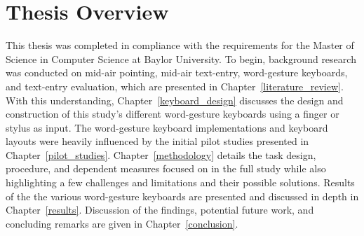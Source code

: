 \section{Thesis Overview}
This thesis was completed in compliance with the requirements for the Master of Science in Computer Science at Baylor University. To begin, background research was conducted on mid-air pointing, mid-air text-entry, word-gesture keyboards, and text-entry evaluation, which are presented in Chapter~\ref{literature_review}. With this understanding, Chapter~\ref{keyboard_design} discusses the design and construction of this study's different word-gesture keyboards using a finger or stylus as input. The word-gesture keyboard implementations and keyboard layouts were heavily influenced by the initial pilot studies presented in Chapter~\ref{pilot_studies}. Chapter~\ref{methodology} details the task design, procedure, and dependent measures focused on in the full study while also highlighting a few challenges and limitations and their possible solutions. Results of the the various word-gesture keyboards are presented and discussed in depth in Chapter~\ref{results}. Discussion of the findings, potential future work, and concluding remarks are given in Chapter~\ref{conclusion}.